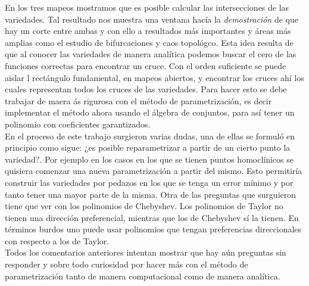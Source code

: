 En los tres mapeos mostramos que es posible calcular las intersecciones de las variedades. Tal resultado nos muestra una ventana hacía la \emph{demostración} de que hay un corte entre ambas y con ello a resultados más importantes y áreas más amplias como el estudio de bifurcaciones y caos topológco. Esta idea resulta de que al conocer las variedades de manera analítica podemos buscar el cero de las funciones correctas para encontrar un cruce. Con el orden suficiente se puede aislar l rectángulo fundamental, en mapeos abiertos, y encontrar los cruces ahí los cuales representan todos los cruces de las variedades. Para hacer esto se debe trabajar de maera ás rigurosa con el método de parametrización, es decir implementar el método ahora usando el álgebra de conjuntos, para así tener un polinomio con coeficientes garantizados.   \\

En el proceso de este trabajo surgieron varias dudas, una de ellas se formuló en principio como sigue: ¿es posible reparametrizar a partir de un cierto punto la variedad?. Por ejemplo en los casos en los que se tienen puntos homoclínicos se quisiera comenzar una nueva parametrización a partir del mismo. Esto permitiría construir las variedades por pedazos en los que se tenga un error mínimo y por tanto tener una mayor parte de la misma. Otra de las preguntas que surguieron tiene que ver con los polinomios de Chebyshev. Los polinomios de Taylor no tienen una dirección preferencial, mientras que los de Chebyshev sí la tienen. En términos burdos uno puede usar polinomios que tengan preferencias direccionales con respecto a los de Taylor. \\


Todos los comentarios anteriores intentan mostrar que hay aún preguntas sin responder y sobre todo curiosidad por hacer más con el método de parametrización tanto de manera computacional como de manera analítica. 

